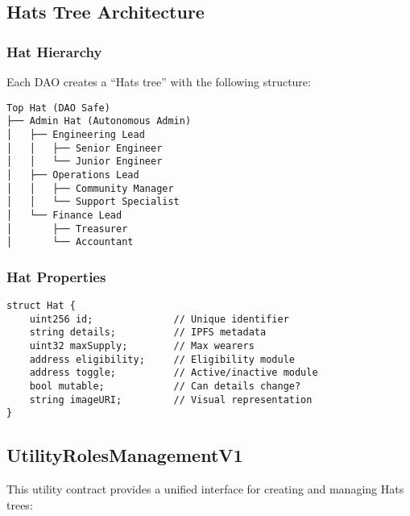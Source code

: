 \documentclass[11pt,a4paper]{article}
\begin{document}
\subsection{Hats Tree Architecture}

\subsubsection{Hat Hierarchy}

Each DAO creates a ``Hats tree'' with the following structure:

\begin{verbatim}
Top Hat (DAO Safe)
├── Admin Hat (Autonomous Admin)
│   ├── Engineering Lead
│   │   ├── Senior Engineer
│   │   └── Junior Engineer
│   ├── Operations Lead
│   │   ├── Community Manager
│   │   └── Support Specialist
│   └── Finance Lead
│       ├── Treasurer
│       └── Accountant
\end{verbatim}

\subsubsection{Hat Properties}

\begin{lstlisting}[caption=Hat Structure]
struct Hat {
    uint256 id;              // Unique identifier
    string details;          // IPFS metadata
    uint32 maxSupply;        // Max wearers
    address eligibility;     // Eligibility module
    address toggle;          // Active/inactive module
    bool mutable;            // Can details change?
    string imageURI;         // Visual representation
}
\end{lstlisting}

\subsection{UtilityRolesManagementV1}

This utility contract provides a unified interface for creating and managing Hats trees:
\end{document}
